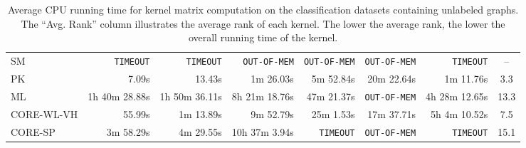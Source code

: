 \documentclass[twoside,11pt]{article}
\begin{document}
\begin{table}[t]
{\begin{tabular}{lrrrrrrc}
SM & \texttt{TIMEOUT} & \texttt{TIMEOUT} & \texttt{OUT-OF-MEM} & \texttt{OUT-OF-MEM} & \texttt{OUT-OF-MEM} & \texttt{TIMEOUT} & -- \\
PK & 7.09s & 13.43s & 1m 26.03s & 5m 52.84s & 20m 22.64s & 1m 11.76s & 3.3 \\ 
ML & 1h 40m 28.88s & 1h 50m 36.11s & 8h 21m 18.76s & 47m 21.37s & \texttt{OUT-OF-MEM} & 4h 28m 12.65s & 13.3 \\ 
CORE-WL-VH & 55.99s & 1m 13.89s & 9m 52.79s & 25m 1.53s & 17m 37.71s & 5h 4m 10.52s & 7.5 \\ 
CORE-SP & 3m 58.29s & 4m 29.55s & 10h 37m 3.94s & \texttt{TIMEOUT} & \texttt{OUT-OF-MEM} & \texttt{TIMEOUT} & 15.1 \\
\bottomrule
\end{tabular}
}
\caption{Average CPU running time for kernel matrix computation on the  classification datasets containing unlabeled graphs. The ``Avg. Rank'' column illustrates the average rank of each kernel. The lower the average rank, the lower the overall running time of the kernel.}
\label{tab:runtimes_unlabeled}
\end{table}
\end{document}
